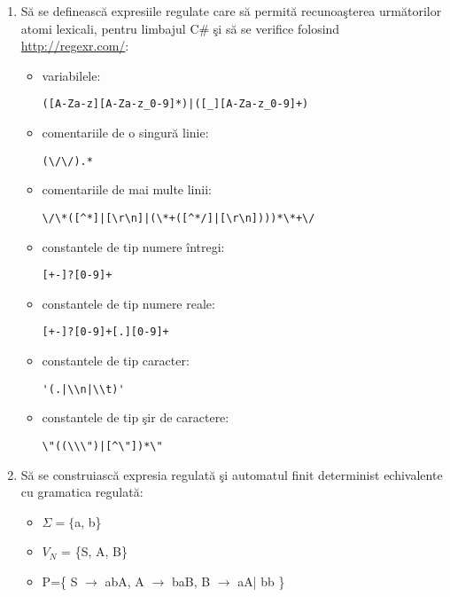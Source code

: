 \begin{enumerate}
\item
Să se definească expresiile regulate care să permită recunoaşterea următorilor atomi lexicali, pentru limbajul C\# şi să se verifice folosind \url{http://regexr.com/}:

\begin{itemize}
\item
variabilele:

\begin{verbatim}
([A-Za-z][A-Za-z_0-9]*)|([_][A-Za-z_0-9]+)
\end{verbatim}

\item
comentariile de o singură linie:

\begin{verbatim}
(\/\/).*
\end{verbatim}

\item
comentariile de mai multe linii:

\begin{verbatim}
\/\*([^*]|[\r\n]|(\*+([^*/]|[\r\n])))*\*+\/
\end{verbatim}

\item
constantele de tip numere întregi:

\begin{verbatim}
[+-]?[0-9]+
\end{verbatim}

\item
constantele de tip numere reale:

\begin{verbatim}
[+-]?[0-9]+[.][0-9]+
\end{verbatim}

\item
constantele de tip caracter:

\begin{verbatim}
'(.|\\n|\\t)'
\end{verbatim}

\item
constantele de tip şir de caractere:
\begin{verbatim}
\"((\\\")|[^\"])*\"
\end{verbatim}
\end{itemize}

\item
Să se construiască expresia regulată şi automatul finit determinist echivalente cu gramatica regulată:
\begin{itemize}
\item 
$\Sigma = \{$a, b\}
\item
$V_{N}$ = \{S, A, B\}
\item
P=\{ S $\rightarrow$ abA, A $\rightarrow$ baB, B $\rightarrow$ aA| bb \}
\end{itemize}


\end{enumerate}
